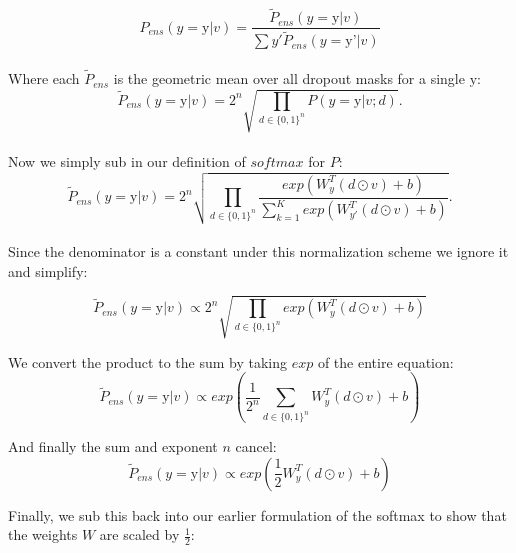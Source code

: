 \documentclass{amsart}
\theoremstyle{definition}
\theoremstyle{remark}
\numberwithin{equation}{section}
\begin{document}
\begin{equation}
P_{ens}(y = \mbox{y} | v) = \frac{\tilde{P}_{ens}(y = \mbox{y} | v)}{\sum{y'} \tilde{P}_{ens}(y = \mbox{y'} | v)}
\end{equation} \\

Where each $\tilde{P}_{ens}$ is the geometric mean over all dropout masks for a single $\mbox{y}$: \\

\begin{equation}
\tilde{P}_{ens}(y = \mbox{y} | v) = 2^n \sqrt{ \prod_{d \in \{0, 1\}^n} P(y = \mbox{y} | v;d ) }.
\end{equation} \\

Now we simply sub in our definition of $softmax$ for $P$: \\

\begin{equation}
\tilde{P}_{ens}(y = \mbox{y} | v) = 2^n \sqrt{ \prod_{d \in \{0, 1\}^n}
                \frac{exp \left( W_y^T(d \odot v) + b \right)}
                     {\sum_{k=1}^K exp \left( W_{y'}^T(d \odot v) + b \right)}}.
\end{equation} \\

Since the denominator is a constant under this normalization scheme we ignore it
and simplify:

\begin{equation}
\tilde{P}_{ens}(y = \mbox{y} | v) \propto 2^n \sqrt{ \prod_{d \in \{0, 1\}^n} exp \left( W_y^T(d \odot v) + b \right)}
\end{equation}

We convert the product to the sum by taking $exp$ of the entire equation: \\

\begin{equation}
\tilde{P}_{ens}(y = \mbox{y} | v) \propto exp \left( \frac{1}{2^n} \sum_{d \in \{0, 1\}^n} W_y
^T(d \odot v) + b \right)
\end{equation}

And finally the sum and exponent $n$ cancel: \\

\begin{equation}
\tilde{P}_{ens}(y = \mbox{y} | v) \propto exp \left( \frac{1}{2}  W_y^T(d \odot v) + b \right)
\end{equation}

Finally, we sub this back into our earlier formulation of the softmax to show
that the weights $W$ are scaled by $\frac{1}{2}$: \\
\end{document}
